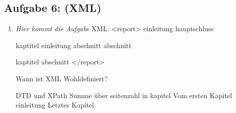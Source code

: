 \subsection{Aufgabe 6: (XML)}
\label{sec:Aufgabe6}
\begin{enumerate}[label=\alph*)]
    \item \textit{Hier kommt die Aufgabe}
    XML:
<report>
    einleitung
    hauptschluss
    
    kaptitel
        einleitung
        abschnitt
        abschnitt
        
    kaptitel
        abschnitt
</report>

Wann ist XML Wohldefiniert?

DTD und XPath
Summe über seitenzahl in kapitel
Vom ersten Kapitel einleitung
Letztes Kapitel
\end{enumerate}